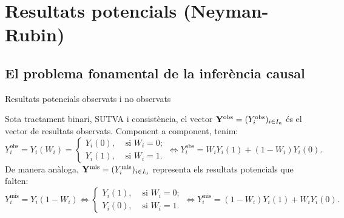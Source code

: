 \documentclass{bestbeamer}
\begin{document}
\section{Resultats potencials (Neyman-Rubin)}
\subsection{El problema fonamental de la inferència causal}
\begin{frame}{Resultats potencials observats i no observats}
\begin{definition}\label{def:obsnoobs}
Sota tractament binari, SUTVA i consistència, el vector $\mathbf{Y}^{\operatorname{obs}}=(Y_i^{\operatorname{obs}})_{i\in I_{\mathrm u}}$ és el vector de resultats observats. Component a component, tenim:
\begin{equation*}
Y_i^{\operatorname{obs}}=Y_i(W_i)=\begin{cases}
Y_i(0), &\text{ si } W_i=0; \\
Y_i(1), &\text{ si } W_i=1 .
\end{cases}\iff Y_i^{\operatorname{obs}}=W_iY_i(1)+(1-W_i)Y_i(0).
\end{equation*}
De manera anàloga, $\mathbf{Y}^{\operatorname{mis}}=(Y_i^{\operatorname{mis}})_{i\in I_{\mathrm u}}$ representa els resultats potencials que falten:
\begin{equation*}
Y_i^{\operatorname{mis}}=Y_i(1-W_i)\iff \begin{cases}
Y_i(1), &\text{ si } W_i=0; \\
Y_i(0), &\text{ si } W_i=1 .
\end{cases}
\iff Y_i^{\operatorname{mis}}=(1-W_i)Y_i(1)+W_iY_i(0).
\end{equation*}
\end{definition}
\end{frame}
\end{document}
